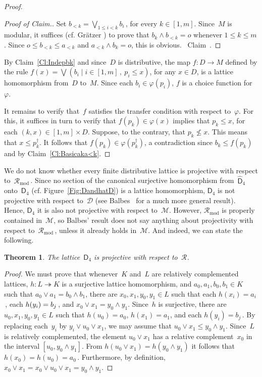 \documentclass[reqno]{amsart}
\numberwithin{equation}{section}
\theoremstyle{plain}
\newtheorem{theorem}{Theorem}[section]
\theoremstyle{definition}
\theoremstyle{remark}
\newenvironment{cproof}
{\begin{proof}[Proof of Claim.]}
{{{}~{\rm Claim~{\theclaim}.}}\end{proof}}
\numberwithin{figure}{section}
\numberwithin{table}{section}
\begin{document}
\begin{proof}
\begin{cproof}
Set $b_{<k}=\bigvee_{1\leq i<k}b_i$\,, for every $k\in[1,m]$.
Since~$M$ is modular, it suffices (cf. Gr\"atzer \cite[Theorem~360]{LTF}) to prove that $b_k\wedge b_{<k}=o$ whenever $1\leq k\leq m$.
Since $o\leq b_{<k}\leq a_{<k}$ and $a_{<k}\wedge b_k=o$, this is obvious.
\end{cproof}

By Claim~\ref{Cl:Indepbk} and since~$D$ is distributive, the map $f\colon D\to M$ defined by the rule $f(x)=\bigvee{\left({{b_i}}\mid{{i\in[1,m]\,,\ p_i\leq x}}\right)}$, for any $x\in D$, is a lattice homomorphism from~$D$ to~$M$.
Since each $b_i\in{\varphi}(p_i)$, $f$ is a choice function for~${\varphi}$.

It remains to verify that~$f$ satisfies the transfer condition with respect to~${\varphi}$.
For this, it suffices in turn to verify that $f(p_k)\in{\varphi}(x)$ implies that $p_k\leq x$, for each $(k,x)\in[1,m]\times D$.
Suppose, to the contrary, that $p_k\nleq x$.
This means that $x\leq p^{\dagger}_k$.
It follows that $f(p_k)\in{\varphi}(p^{\dagger}_k)$, a contradiction since $b_k\leq f(p_k)$ and by Claim~\ref{Cl:Basicaka<k}.
\end{proof}

We do not know whether every finite distributive lattice is projective with respect to~${\mathcal{R}_{\mathrm{mod}}}$\,.
Since no section of the canonical surjective homomorphism from~${\widehat{\mathsf{D}}_{4}}$ onto~${\mathsf{D}_{4}}$ (cf. Figure~\ref{Fig:DandhatD}) is a lattice homomorphism, ${\mathsf{D}_{4}}$ is not projective with respect to~${\mathcal{D}}$ (see Balbes~\cite{Balb67} for a much more general result).
Hence, ${\mathsf{D}_{4}}$ it is also not projective with respect to~${\mathcal{M}}$.
However, ${\mathcal{R}_{\mathrm{mod}}}$ is properly contained in~${\mathcal{M}}$, so Balbes' result does not say anything about projectivity with respect to~${\mathcal{R}_{\mathrm{mod}}}$\,, unless it already holds in~${\mathcal{M}}$.
And indeed, we can state the following.

\begin{theorem}\label{T:D4RelCplProj}
The lattice~${\mathsf{D}_{4}}$ is projective with respect to~${\mathcal{R}}$.
\end{theorem}

\begin{proof}
We must prove that whenever~$K$ and~$L$ are relatively complemented lattices, $h\colon L\twoheadrightarrow K$ is a surjective lattice homomorphism, and $a_0,a_1,b_0,b_1\in K$ such that $a_0\vee a_1=b_0\wedge b_1$, there are $x_0,x_1,y_0,y_1\in L$ such that each $h(x_i)=a_i$\,, each $h(y_i)=\nobreak b_j$\,, and $x_0\vee x_1=y_0\wedge y_1$.
Since~$h$ is surjective, there are $u_0,x_1,y_0,y_1\in L$ such that $h(u_0)=a_0$, $h(x_1)=a_1$, and each $h(y_i)=b_j$\,.
By replacing each~$y_i$ by $y_i\vee u_0\vee x_1$, we may assume that $u_0\vee x_1\leq y_0\wedge y_1$.
Since~$L$ is relatively complemented, the element $u_0\vee x_1$ has a relative complement~$x_0$ in the interval $[u_0,y_0\wedge y_1]$.
{}From $h(u_0\vee x_1)=h(y_0\wedge y_1)$ it follows that $h(x_0)=h(u_0)=a_0$\,.
Furthermore, by definition, $x_0\vee x_1=x_0\vee u_0\vee x_1=y_0\wedge y_1$.
\end{proof}
\end{document}
